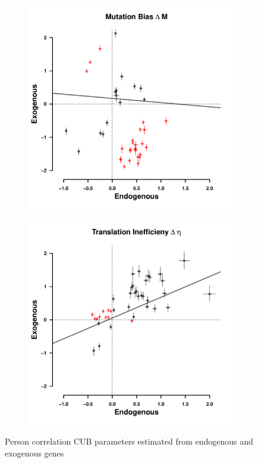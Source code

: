 \documentclass[12pt]{article}
\begin{document}
\begin{figure}[H]
    \centering
    \begin{subfigure}
        \centering
        \includegraphics[width=.45\textwidth]{img/csp_corr_dm.pdf}
    \end{subfigure}
    \begin{subfigure}
        \centering
        \includegraphics[width=.45\textwidth]{img/csp_corr_deta.pdf}
    \end{subfigure}
    \caption{Person correlation CUB parameters estimated from endogenous and exogenous genes}
    \label{fig:csp_comp}
\end{figure}
\end{document}
